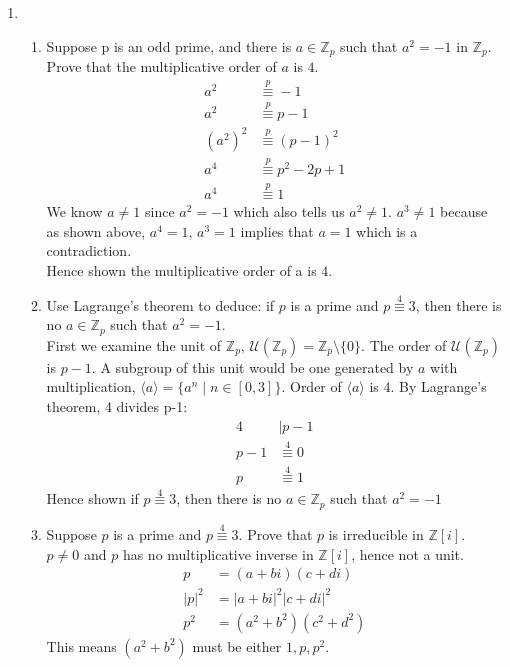 \documentclass[12pt]{article}
\begin{document}
\begin{enumerate}
	\item 
		\begin{enumerate}
			\item Suppose p is an odd prime, and there is $a\in\mathbb{Z}_p$ such that
				$a^2 = -1$ in $\mathbb{Z}_p$. Prove that the multiplicative order of $a$
				is $4$.
				\begin{align*}
					a^2 &\overset{p}{\equiv} -1\\
					a^2 &\overset{p}{\equiv} p-1\\
					(a^2)^2 &\overset{p}{\equiv} (p-1)^2\\
					a^4 &\overset{p}{\equiv} p^2 -2p +1\\
					a^4 &\overset{p}{\equiv} 1
				\end{align*}
				We know $a\neq 1$ since $a^2 = -1$ which also tells us $a^2 \neq 1$.
				$a^3 \neq 1$ because as shown above, $a^4 = 1$, $a^3 = 1$ implies that
				$a = 1$ which is a contradiction.\\
				Hence shown the multiplicative order of a is $4$.

			\item Use Lagrange's theorem to deduce: if $p$ is a prime and $p
				\overset{4}{\equiv} 3$, then there is no $a\in\mathbb{Z}_p$ such that
				$a^2 = -1$.\\
				First we examine the unit of $\mathbb{Z}_p$, $\mathcal{U}(\mathbb{Z}_p)
				= \mathbb{Z}_p \setminus \{0\}$. The order of
				$\mathcal{U}(\mathbb{Z}_p)$ is $p-1$. A subgroup of this unit would be
				one generated by $a$ with multiplication, $\langle a \rangle = \{a^n
				\mid n\in [0,3]\}$. Order of $\langle a \rangle$ is $4$. By Lagrange's
				theorem, 4 divides p-1:
				\begin{align*}
					4 &\mid p-1\\
					p-1 &\overset{4}{\equiv} 0\\
					p &\overset{4}{\equiv} 1
				\end{align*}
				Hence shown if $p \overset{4}{\equiv} 3$, then there is no
				$a\in\mathbb{Z}_p$ such that $a^2 = -1$

			\item Suppose $p$ is a prime and $p \overset{4}{\equiv} 3$. Prove that $p$
				is irreducible in $\mathbb{Z}[i]$. \\
				$p \neq 0$ and $p$ has no multiplicative inverse in $\mathbb{Z}[i]$,
				hence not a unit.
				\begin{align*}
					p &= (a+bi)(c+di)\\
					|p|^2 &= |a+bi|^2|c+di|^2\\
					p^2 &= (a^2 + b^2)(c^2 + d^2)
				\end{align*}
				This means $(a^2 + b^2)$ must be either $1, p, p^2$.

\end{enumerate}
\end{enumerate}
\end{document}
